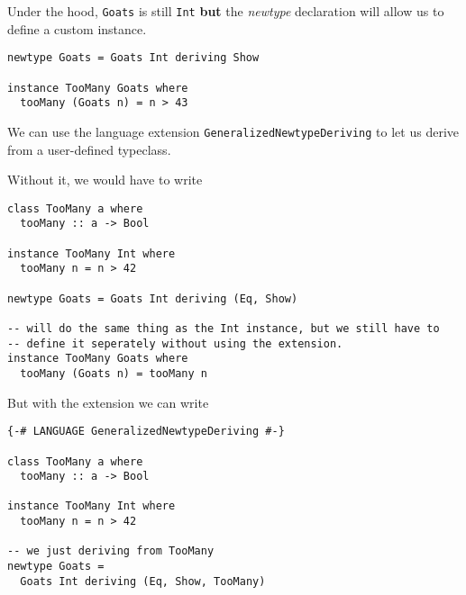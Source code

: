 Under the hood, \texttt{Goats} is still \texttt{Int} \textbf{but} the \emph{newtype} declaration
will allow us to define a custom instance.


\begin{lstlisting}
newtype Goats = Goats Int deriving Show

instance TooMany Goats where
  tooMany (Goats n) = n > 43
\end{lstlisting}

We can use the language extension \texttt{GeneralizedNewtypeDeriving} to let us derive from a user-defined
typeclass.

Without it, we would have to write
\begin{lstlisting}
class TooMany a where 
  tooMany :: a -> Bool

instance TooMany Int where
  tooMany n = n > 42

newtype Goats = Goats Int deriving (Eq, Show)

-- will do the same thing as the Int instance, but we still have to
-- define it seperately without using the extension.
instance TooMany Goats where
  tooMany (Goats n) = tooMany n
\end{lstlisting}

But with the extension we can write
\begin{lstlisting}
{-# LANGUAGE GeneralizedNewtypeDeriving #-}

class TooMany a where
  tooMany :: a -> Bool

instance TooMany Int where
  tooMany n = n > 42

-- we just deriving from TooMany
newtype Goats =
  Goats Int deriving (Eq, Show, TooMany)
\end{lstlisting}


